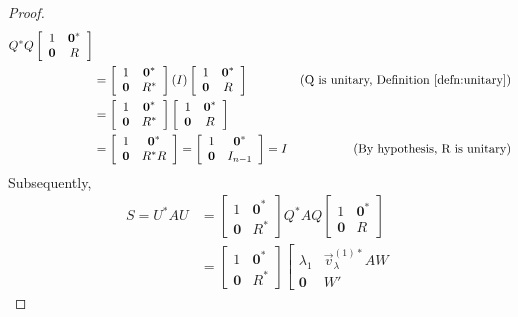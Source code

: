 \begin{proof}
\begin{align*}
Q^* Q 
\left[\begin{array}{cc}
1 & \textbf{0}^* \\
\textbf{0} & R
\end{array}\right] \\
&= \left[\begin{array}{cc}
1 & \textbf{0}^* \\
\textbf{0} & R^*
\end{array}\right]
(I)
\left[\begin{array}{cc}
1 & \textbf{0}^* \\
\textbf{0} & R
\end{array}\right] & \text{(Q is unitary, Definition \ref{defn:unitary})} \\
&= \left[\begin{array}{cc}
1 & \textbf{0}^* \\
\textbf{0} & R^*
\end{array}\right]
\left[\begin{array}{cc}
1 & \textbf{0}^* \\
\textbf{0} & R
\end{array}\right] \\
&=
\left[\begin{array}{cc}
1 & \textbf{0}^* \\
\textbf{0} & R^*R
\end{array}\right] 
=
\left[\begin{array}{cc}
1 & \textbf{0}^* \\
\textbf{0} & I_{n-1}
\end{array}\right] 
= I & \text{(By hypothesis, R is unitary)}
\end{align*}
Subsequently,
\begin{align}
S = U^*AU &= \left[\begin{array}{cc}
1 & \textbf{0}^* \\
\textbf{0} & R^*
\end{array}\right]
Q^* AQ 
\left[\begin{array}{cc}
1 & \textbf{0}^* \\
\textbf{0} & R
\end{array}\right] \nonumber \\
&=
\left[\begin{array}{cc}
1 & \textbf{0}^* \\
\textbf{0} & R^*
\end{array}\right]
\left[\begin{array}{cc}
\lambda_1 & \vec{v}_\lambda^{(1)*}AW \\
\textbf{0} & W'

\end{array}
\end{align}
\end{proof}
